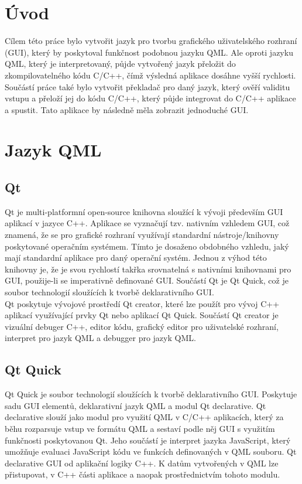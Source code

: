 \documentclass[report,11pt]{elsarticle}
\begin{document}
\section{\label{SEC:Intro}Úvod}
Cílem této práce bylo vytvořit jazyk pro tvorbu grafického uživatelského rozhraní (GUI), který by poskytoval funkčnost podobnou jazyku QML. Ale oproti jazyku QML, který je interpretovaný, půjde vytvořený jazyk přeložit do zkompilovatelného kódu C/C++, čímž výsledná aplikace dosáhne vyšší rychlosti. Součástí práce také bylo vytvořit překladač pro daný jazyk, který ověří validitu vstupu a přeloží jej do kódu C/C++, který půjde integrovat do  C/C++ aplikace a spustit. Tato aplikace by následně měla zobrazit jednoduché GUI.

\section{\label{SEC:QML}Jazyk QML}
\subsection{Qt}
Qt je multi-platformní open-source knihovna sloužící k vývoji především GUI aplikací v jazyce C++. Aplikace se vyznačují tzv. nativním vzhledem GUI, což znamená, že se pro grafické rozhraní využívají standardní nástroje/knihovny poskytované operačním systémem. Tímto je dosaženo obdobného vzhledu, jaký mají standardní aplikace pro daný operační systém. Jednou z výhod této knihovny je, že je svou rychlostí takřka srovnatelná s nativními knihovnami pro GUI, použije-li se imperativně definované GUI. Součástí Qt je Qt Quick, což je soubor technologií sloužících k tvorbě deklarativního GUI.\\
Qt poskytuje vývojové prostředí Qt creator, které lze použít pro vývoj C++ aplikací využívající prvky Qt nebo aplikací Qt Quick. Součástí Qt creator je vizuální debuger C++, editor kódu, grafický editor pro uživatelské rozhraní, interpret pro jazyk QML a debugger pro jazyk QML.

\subsection{Qt Quick}
Qt Quick je soubor technologií sloužících k tvorbě deklarativního GUI. Poskytuje sadu GUI elementů, deklarativní jazyk QML a modul Qt declarative. Qt declarative slouží jako modul pro využití QML v C/C++ aplikacích, který za běhu rozparsuje vstup ve formátu QML a sestaví podle něj GUI s využitím funkčnosti poskytovanou Qt. Jeho součástí je interpret jazyka JavaScript, který umožňuje evaluaci JavaScript kódu ve funkcích definovaných v QML souboru. Qt declarative GUI od aplikační logiky C++. K datům vytvořených v QML lze přistupovat, v C++ části aplikace a naopak prostřednictvím tohoto modulu.
\end{document}
